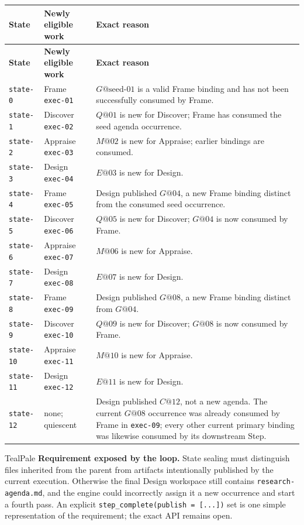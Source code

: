 \documentclass[11pt]{article}
\newcommand{\artifact}[1]{\texttt{#1}}
\begin{document}
{\scriptsize
\begin{longtable}{@{}L{0.72in}L{1.35in}L{4.00in}@{}}
\toprule
\textbf{State} & \textbf{Newly eligible work} & \textbf{Exact reason} \\
\midrule
\endfirsthead
\toprule
\textbf{State} & \textbf{Newly eligible work} & \textbf{Exact reason} \\
\midrule
\endhead
\texttt{state-0} & Frame \texttt{exec-01} & \(G@\mathrm{seed\mbox{-}01}\) is a valid Frame binding and has not been successfully consumed by Frame. \\
\texttt{state-1} & Discover \texttt{exec-02} & \(Q@01\) is new for Discover; Frame has consumed the seed agenda occurrence. \\
\texttt{state-2} & Appraise \texttt{exec-03} & \(M@02\) is new for Appraise; earlier bindings are consumed. \\
\texttt{state-3} & Design \texttt{exec-04} & \(E@03\) is new for Design. \\
\texttt{state-4} & Frame \texttt{exec-05} & Design published \(G@04\), a new Frame binding distinct from the consumed seed occurrence. \\
\texttt{state-5} & Discover \texttt{exec-06} & \(Q@05\) is new for Discover; \(G@04\) is now consumed by Frame. \\
\texttt{state-6} & Appraise \texttt{exec-07} & \(M@06\) is new for Appraise. \\
\texttt{state-7} & Design \texttt{exec-08} & \(E@07\) is new for Design. \\
\texttt{state-8} & Frame \texttt{exec-09} & Design published \(G@08\), a new Frame binding distinct from \(G@04\). \\
\texttt{state-9} & Discover \texttt{exec-10} & \(Q@09\) is new for Discover; \(G@08\) is now consumed by Frame. \\
\texttt{state-10} & Appraise \texttt{exec-11} & \(M@10\) is new for Appraise. \\
\texttt{state-11} & Design \texttt{exec-12} & \(E@11\) is new for Design. \\
\texttt{state-12} & none; quiescent & Design published \(C@12\), not a new agenda. The current \(G@08\) occurrence was already consumed by Frame in \texttt{exec-09}; every other current primary binding was likewise consumed by its downstream Step. \\
\bottomrule
\end{longtable}
}

\begin{decisionbox}{TealPale}
\textbf{Requirement exposed by the loop.} State sealing must distinguish files
inherited from the parent from artifacts intentionally published by the current
execution. Otherwise the final Design workspace still contains
\artifact{research-agenda.md}, and the engine could incorrectly assign it a new
occurrence and start a fourth pass. An explicit
\texttt{step\_complete(publish = [...])} set is one simple representation of
the requirement; the exact API remains open.
\end{decisionbox}
\end{document}
